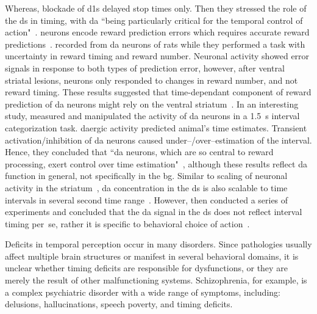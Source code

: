 Whereas, blockade of \glspl{d1} delayed stop times only.
Then they stressed the role of the \gls{ds} in timing, with \gls{da} ``being particularly critical for the temporal control of action"~\cite{DeCorte2019}.
 neurons encode reward prediction errors which requires accurate reward predictions~\cite[see][]{Berke2018NN}.
 recorded from \gls{da} neurons of rats while they performed a task with uncertainty in reward timing and reward number.
Neuronal activity showed error signals in response to both types of prediction error, however, after ventral striatal lesions, neurons only responded to changes in reward number, and not reward timing.
These results suggested that time-dependant component of reward prediction of \gls{da} neurons might rely on the ventral striatum~\cite{Takahashi2016}.
In an interesting study,  measured and manipulated the activity of \gls{da} neurons in a 1.5~s interval categorization task.
\Gls{da}ergic activity predicted animal's time estimates.
Transient activation/inhibition of \gls{da} neurons caused under--/over--estimation of the interval.
Hence, they concluded that ``\gls{da} neurons, which are so central to reward processing, exert control over time estimation"~\cite{Paton2016Sci}, although these results reflect \gls{da} function in general, not specifically in the \gls{bg}.
Similar to scaling of neuronal activity in the striatum~\cite{Mello2015}, \gls{da} concentration in the \gls{ds} is also scalable to time intervals in several second time range~\cite{Howard2017}.
However, \citeauthor{Howard2017} then conducted a series of experiments and concluded that the \gls{da} signal in the \gls{ds} does not reflect interval timing per~se, rather it is specific to behavioral choice of action~\cite{Howard2017}.
\par
Deficits in temporal perception occur in many disorders.
Since pathologies usually affect multiple brain structures or manifest in several behavioral domains, it is unclear whether timing deficits are responsible for dysfunctions, or they are merely the result of other malfunctioning systems.
Schizophrenia, for example, is a complex psychiatric disorder with a wide range of symptoms, including: delusions, hallucinations, speech poverty, and timing deficits.
